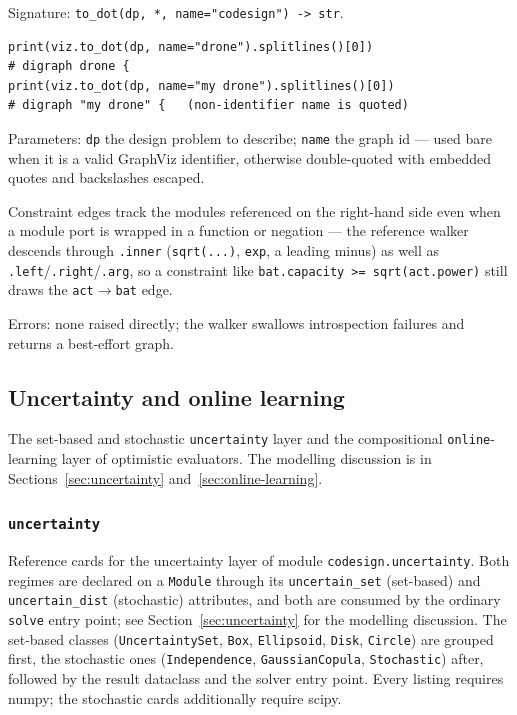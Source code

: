 \documentclass[11pt,a4paper]{article}
\begin{document}
Signature: \texttt{to\_dot(dp, *, name="codesign") -> str}.

\begin{lstlisting}
print(viz.to_dot(dp, name="drone").splitlines()[0])
# digraph drone {
print(viz.to_dot(dp, name="my drone").splitlines()[0])
# digraph "my drone" {   (non-identifier name is quoted)
\end{lstlisting}

Parameters: \texttt{dp} the design problem to describe; \texttt{name} the
graph id --- used bare when it is a valid GraphViz identifier, otherwise
double-quoted with embedded quotes and backslashes escaped.

Constraint edges track the modules referenced on the right-hand side even
when a module port is wrapped in a function or negation --- the reference
walker descends through \texttt{.inner} (\texttt{sqrt(...)}, \texttt{exp},
a leading minus) as well as \texttt{.left}/\texttt{.right}/\texttt{.arg},
so a constraint like \texttt{bat.capacity >= sqrt(act.power)} still draws
the \texttt{act}$\rightarrow$\texttt{bat} edge.

Errors: none raised directly; the walker swallows introspection failures
and returns a best-effort graph.

\subsection{Uncertainty and online learning}

The set-based and stochastic \texttt{uncertainty} layer and the
compositional \texttt{online}-learning layer of optimistic evaluators. The
modelling discussion is in Sections~\ref{sec:uncertainty}
and~\ref{sec:online-learning}.

\subsubsection{\texttt{uncertainty}}
\label{ref:uncertainty}

Reference cards for the uncertainty layer of module
\texttt{codesign.uncertainty}. Both regimes are declared on a
\texttt{Module} through its \texttt{uncertain\_set} (set-based) and
\texttt{uncertain\_dist} (stochastic) attributes, and both are consumed by
the ordinary \texttt{solve} entry point; see Section~\ref{sec:uncertainty}
for the modelling discussion. The set-based classes
(\texttt{UncertaintySet}, \texttt{Box}, \texttt{Ellipsoid}, \texttt{Disk},
\texttt{Circle}) are grouped first, the stochastic ones
(\texttt{Independence}, \texttt{GaussianCopula}, \texttt{Stochastic}) after,
followed by the result dataclass and the solver entry point. Every
listing requires numpy; the stochastic cards additionally require scipy.
\end{document}
